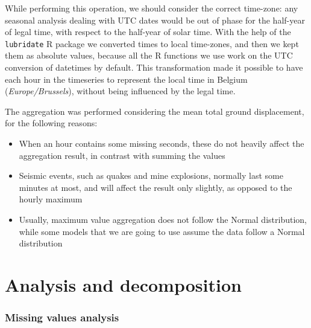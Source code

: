 \documentclass[12pt]{article}
\begin{document}
While performing this operation, we should consider the correct time-zone: any seasonal analysis dealing with UTC dates would be out of phase for the half-year of legal time, with respect to the half-year of solar time. With the help of the \texttt{lubridate} R package we converted times to local time-zones, and then we kept them as absolute values, because all the R functions we use work on the UTC conversion of datetimes by default. This transformation made it possible to have each hour in the timeseries to represent the local time in Belgium (\textit{Europe/Brussels}), without being influenced by the legal time.

The aggregation was performed considering the mean total ground displacement, for the following reasons:
\begin{itemize}[topsep=0.5em,itemsep=0em,partopsep=0.5em]
	\item When an hour contains some missing seconds, these do not heavily affect the aggregation result, in contrast with summing the values
	\item Seismic events, such as quakes and mine explosions, normally last some minutes at most, and will affect the result only slightly, as opposed to the hourly maximum
	\item Usually, maximum value aggregation does not follow the Normal distribution, while some models that we are going to use assume the data follow a Normal distribution
\end{itemize}

\section{Analysis and decomposition}
\subsubsection{Missing values analysis}


\end{document}
